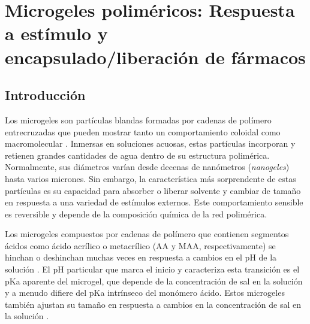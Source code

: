 
\chapter{Microgeles polim\'ericos: Respuesta a est\'imulo y encapsulado/liberaci\'on de f\'armacos} %

\label{Chapter-geles} %


\newcommand{\keyword}[1]{\textbf{#1}}
\newcommand{\tabhead}[1]{\textbf{#1}}
\newcommand{\code}[1]{\texttt{#1}}
\newcommand{\file}[1]{\texttt{\bfseries#1}}
\newcommand{\option}[1]{\texttt{\itshape#1}}





\section{Introducci\'on}


Los microgeles son part\'iculas blandas formadas por cadenas de pol\'imero entrecruzadas que pueden mostrar tanto un comportamiento coloidal como macromolecular \cite{plamper2017functional,lyon2012polymer}.
Inmersas en soluciones acuosas, estas part\'iculas incorporan y retienen grandes cantidades de agua dentro de su estructura polim\'erica.
Normalmente, sus di\'ametros var\'ian desde decenas de nan\'ometros (\emph{nanogeles}) hasta varios micrones.
Sin embargo, la caracter\'istica m\'as sorprendente de estas part\'iculas es su capacidad para absorber o liberar solvente y cambiar de tama\~no en respuesta a una variedad de est\'imulos externos.
Este comportamiento sensible es reversible y depende de la composici\'on qu\'imica de la red polim\'erica.

Los microgeles compuestos por cadenas de pol\'imero que contienen segmentos \'acidos como \'acido acr\'ilico o metacr\'ilico (AA y MAA, respectivamente) se hinchan o deshinchan muchas veces en respuesta a cambios en el pH de la soluci\'on \cite{snowden1996colloidal,Zhou1998}.
El pH particular que marca el inicio y caracteriza esta transición es el pKa aparente del microgel, que depende de la concentraci\'on de sal en la soluci\'on y a menudo difiere del pKa intr\'inseco del mon\'omero \'acido.
Estos microgeles tambi\'en ajustan su tama\~no en respuesta a cambios en la concentraci\'on de sal en la soluci\'on \cite{snowden1996colloidal}.

